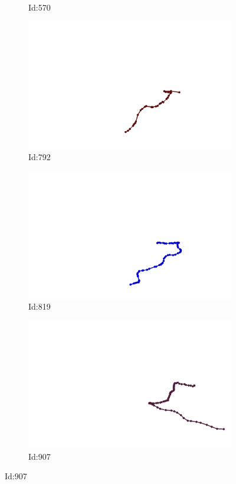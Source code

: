 \documentclass[12pt,twoside]{report}
\begin{document}
\begin{figure}
\begin{subfigure}[b]{0.20\textwidth}
\caption{Id:570}
\end{subfigure}
\begin{subfigure}[b]{0.20\textwidth}
\centering
\includegraphics[width=\textwidth]{../../trajectories/792.png}
\caption{Id:792}
\end{subfigure}
\begin{subfigure}[b]{0.20\textwidth}
\centering
\includegraphics[width=\textwidth]{../../trajectories/819.png}
\caption{Id:819}
\end{subfigure}
\begin{subfigure}[b]{0.20\textwidth}
\centering
\includegraphics[width=\textwidth]{../../trajectories/907.png}
\caption{Id:907}
\end{subfigure}
\end{figure}
\end{document}
